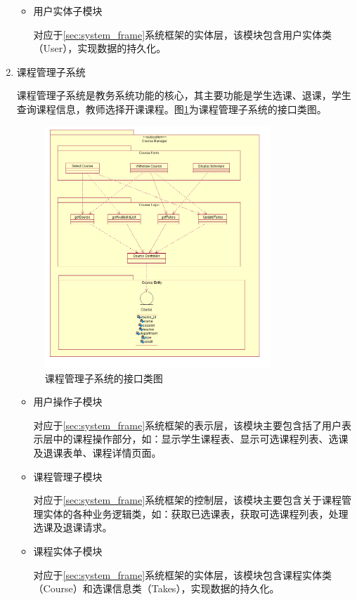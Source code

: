 \begin{enumerate}
\begin{itemize}
    \item 用户实体子模块
    
    \CJKindent 对应于\ref{sec:system_frame}系统框架的实体层，该模块包含用户实体类（User），实现数据的持久化。
  \end{itemize}
  
  \item 课程管理子系统
  
  \CJKindent 课程管理子系统是教务系统功能的核心，其主要功能是学生选课、退课，学生查询课程信息，教师选择开课课程。图\ref{fig:subsystem_coursemgr_interface}为课程管理子系统的接口类图。
  
  \begin{figure}[H]
    \centering
    \includegraphics[width=0.8\textwidth]{img/coursemgr_interface}
    \caption{课程管理子系统的接口类图}
    \label{fig:subsystem_coursemgr_interface}
  \end{figure}
  
  \begin{itemize}
    \item 用户操作子模块
    
    \CJKindent 对应于\ref{sec:system_frame}系统框架的表示层，该模块主要包含括了用户表示层中的课程操作部分，如：显示学生课程表、显示可选课程列表、选课及退课表单、课程详情页面。
    
    \item 课程管理子模块
    
    \CJKindent 对应于\ref{sec:system_frame}系统框架的控制层，该模块主要包含关于课程管理实体的各种业务逻辑类，如：获取已选课表，获取可选课程列表，处理选课及退课请求。

    \item 课程实体子模块
    
    \CJKindent 对应于\ref{sec:system_frame}系统框架的实体层，该模块包含课程实体类（Course）和选课信息类（Takes），实现数据的持久化。
  \end{itemize}
\end{enumerate}
